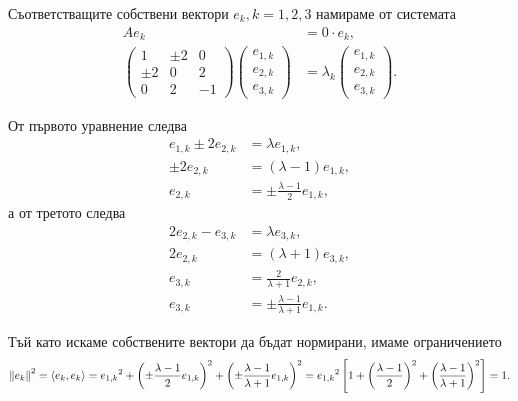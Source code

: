 \documentclass[numbers=endperiod, DIV=15, bibliography=totocnumbered]{scrartcl}
\begin{document}
\begin{solution}
  Съответстващите собствени вектори $e_k, k = 1, 2, 3$ намираме от системата
  \begingroup
  \allowdisplaybreaks
  \begin{align*}
    A e_k &= 0 \cdot e_k,
    \\
    \begin{pmatrix}
      1 & \pm 2 & 0 \\
      \pm 2 & 0 & 2 \\
      0 & 2 & -1
    \end{pmatrix}
    \begin{pmatrix}
      e_{1,k} \\ e_{2,k} \\ e_{3,k}
    \end{pmatrix}
    &=
    \lambda_k
    \begin{pmatrix}
      e_{1,k} \\ e_{2,k} \\ e_{3,k}
    \end{pmatrix}.
  \end{align*}
  \endgroup

  От първото уравнение следва
  \begin{align*}
    e_{1,k} \pm 2 e_{2,k} &= \lambda e_{1,k},
    \\
    \pm 2 e_{2,k} &= (\lambda - 1) e_{1,k},
    \\
    e_{2,k} &= \pm \frac {\lambda - 1} 2 e_{1,k},
  \end{align*}
  а от третото следва
  \begin{align*}
    2e_{2,k} - e_{3,k} &= \lambda e_{3,k},
    \\
    2 e_{2,k} &= (\lambda + 1) e_{3,k},
    \\
    e_{3,k} &= \frac 2 {\lambda + 1} e_{2,k},
    \\
    e_{3,k} &= \pm \frac {\lambda - 1} {\lambda + 1} e_{1,k}.
  \end{align*}

  Тъй като искаме собствените вектори да бъдат нормирани, имаме ограничението
  \begin{multline*}
    {\left\Vert e_k \right\Vert}^2
    =
    \left\langle e_k, e_k \right\rangle
    =
    {e_{1,k}}^2 + {\left(\pm \frac {\lambda - 1} 2 e_{1,k} \right)}^2 + {\left(\pm \frac {\lambda - 1} {\lambda + 1} e_{1,k} \right)}^2
    =
    {e_{1,k}}^2 \left[1 + {\left(\frac {\lambda - 1} 2 \right)}^2 + {\left(\frac {\lambda - 1} {\lambda + 1} \right)}^2 \right]
    =
    1.
  \end{multline*}


\end{solution}
\end{document}

